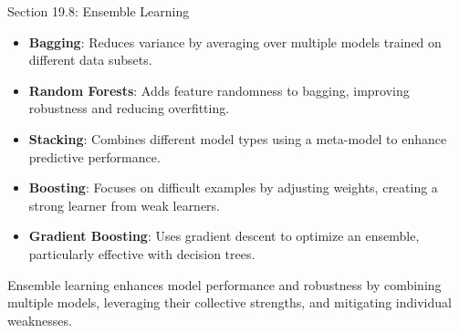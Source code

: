 \begin{notes}{Section 19.8: Ensemble Learning}
\begin{highlight}
    \end{highlight}
    
    \begin{highlight}
    
        \begin{itemize}
            \item \textbf{Bagging}: Reduces variance by averaging over multiple models trained on different data subsets.
            \item \textbf{Random Forests}: Adds feature randomness to bagging, improving robustness and reducing overfitting.
            \item \textbf{Stacking}: Combines different model types using a meta-model to enhance predictive performance.
            \item \textbf{Boosting}: Focuses on difficult examples by adjusting weights, creating a strong learner from weak learners.
            \item \textbf{Gradient Boosting}: Uses gradient descent to optimize an ensemble, particularly effective with decision trees.
        \end{itemize}
    
        Ensemble learning enhances model performance and robustness by combining multiple models, leveraging their collective strengths, and mitigating individual weaknesses.
    
    \end{highlight}
\end{notes}